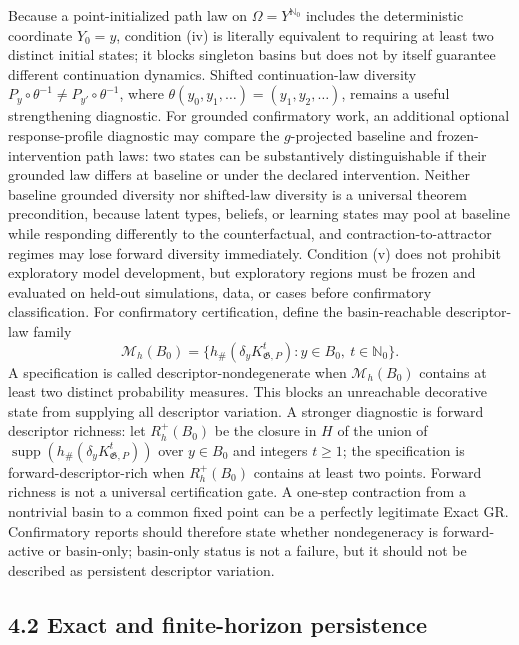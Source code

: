 \documentclass[10pt]{article}
\newcommand{\push}{\mathord{\#}}
\begin{document}
Because a point-initialized path law on $\Omega=Y^{\mathbb N_0}$ includes the deterministic coordinate $Y_0=y$, condition (iv) is literally equivalent to requiring at least two distinct initial states; it blocks singleton basins but does not by itself guarantee different continuation dynamics. Shifted continuation-law diversity $P_y\circ\theta^{-1}\ne P_{y'}\circ\theta^{-1}$, where $\theta(y_0,y_1,\ldots)=(y_1,y_2,\ldots)$, remains a useful strengthening diagnostic. For grounded confirmatory work, an additional optional response-profile diagnostic may compare the $g$-projected baseline and frozen-intervention path laws: two states can be substantively distinguishable if their grounded law differs at baseline or under the declared intervention. Neither baseline grounded diversity nor shifted-law diversity is a universal theorem precondition, because latent types, beliefs, or learning states may pool at baseline while responding differently to the counterfactual, and contraction-to-attractor regimes may lose forward diversity immediately. Condition (v) does not prohibit exploratory model development, but exploratory regions must be frozen and evaluated on held-out simulations, data, or cases before confirmatory classification. For confirmatory certification, define the basin-reachable descriptor-law family
\[
\mathcal M_h(B_0)=\bigl\{h_{\push}(\delta_y K_{\mathfrak G,P}^{t}):y\in B_0,\ t\in\mathbb N_0\bigr\}.
\]
A specification is called descriptor-nondegenerate when $\mathcal M_h(B_0)$ contains at least two distinct probability measures. This blocks an unreachable decorative state from supplying all descriptor variation. A stronger diagnostic is forward descriptor richness: let $R_h^+(B_0)$ be the closure in $H$ of the union of $\operatorname{supp}(h_{\push}(\delta_y K_{\mathfrak G,P}^{t}))$ over $y\in B_0$ and integers $t\ge1$; the specification is forward-descriptor-rich when $R_h^+(B_0)$ contains at least two points. Forward richness is not a universal certification gate. A one-step contraction from a nontrivial basin to a common fixed point can be a perfectly legitimate Exact GR. Confirmatory reports should therefore state whether nondegeneracy is forward-active or basin-only; basin-only status is not a failure, but it should not be described as persistent descriptor variation.

\subsection{4.2 Exact and finite-horizon
persistence}\label{exact-and-finite-horizon-persistence}
\end{document}
